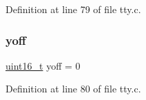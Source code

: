 Definition at line 79 of file tty.\+c.

\mbox{\label{a00179_a1a7539764d0ae8cd06ce45c62cf92bca_a1a7539764d0ae8cd06ce45c62cf92bca}} 
\subsubsection{\texorpdfstring{yoff}{yoff}}
{\footnotesize\ttfamily \hyperlink{a00140_a273cf69d639a59973b6019625df33e30_a273cf69d639a59973b6019625df33e30}{uint16\+\_\+t} yoff = 0}



Definition at line 80 of file tty.\+c.

